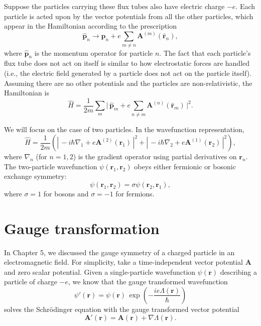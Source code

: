 \documentclass[prx,12pt]{revtex4-2}
\begin{document}
Suppose the particles carrying these flux tubes also have electric
charge $-e$.  Each particle is acted upon by the vector potentials
from all the other particles, which appear in the Hamiltonian
according to the prescription
\begin{equation}
  \hat{\mathbf{p}}_n \rightarrow \hat{\mathbf{p}}_n
  + e \sum_{m \ne n} \mathbf{A}^{(m)}(\hat{\mathbf{r}}_n),
\end{equation}
where $\hat{\mathbf{p}}_n$ is the momentum operator for particle $n$.
The fact that each particle's flux tube does not act on itself is
similar to how electrostatic forces are handled (i.e., the electric
field generated by a particle does not act on the particle itself).
Assuming there are no other potentials and the particles are
non-relativistic, the Hamiltonian is
\begin{equation}
  \hat{H} = \frac{1}{2m} \sum_m \Big| \,\hat{\mathbf{p}}_m
  + e \sum_{n \ne m} \mathbf{A}^{(n)}(\hat{\mathbf{r}}_m)\,\Big|^2.
\end{equation}

We will focus on the case of two particles.  In the wavefunction
representation,
\begin{equation}
  \hat{H} = \frac{1}{2m} \left( \left| \, -i\hbar \nabla_1
  + e\mathbf{A}^{(2)}(\mathbf{r}_1)\,\right|^2
  + \left| \, -i\hbar \nabla_2
  + e\mathbf{A}^{(1)}(\mathbf{r}_2)\,\right|^2\right),
  \label{HamA}
\end{equation}
where $\nabla_n$ (for $n = 1,2$) is the gradient operator using
partial derivatives on $\mathbf{r}_n$.  The two-particle wavefunction
$\psi(\mathbf{r}_1, \mathbf{r}_2)$ obeys either fermionic or bosonic
exchange symmetry:
\begin{equation}
  \psi(\mathbf{r}_1, \mathbf{r}_2) = \sigma \psi(\mathbf{r}_2, \mathbf{r}_1),
  \label{exchange}
\end{equation}
where $\sigma = 1$ for bosons and $\sigma = -1$ for fermions.

\section{Gauge transformation}

In Chapter 5, we discussed the gauge symmetry of a charged particle in
an electromagnetic field.  For simplicity, take a time-independent
vector potential $\mathbf{A}$ and zero scalar potential.  Given a
single-particle wavefunction $\psi(\mathbf{r})$ describing a particle
of charge $-e$, we know that the gauge transformed wavefunction
\begin{equation}
  \psi'(\mathbf{r}) = \psi(\mathbf{r}) \,
  \exp\!\left(-\frac{ie\Lambda(\mathbf{r})}{\hbar}\right)
\end{equation}
solves the Schr\"odinger equation with the gauge transformed vector
potential
\begin{equation*}
  \mathbf{A}'(\mathbf{r}) = \mathbf{A}(\mathbf{r}) + \nabla \Lambda(\mathbf{r}).
\end{equation*}
\end{document}
